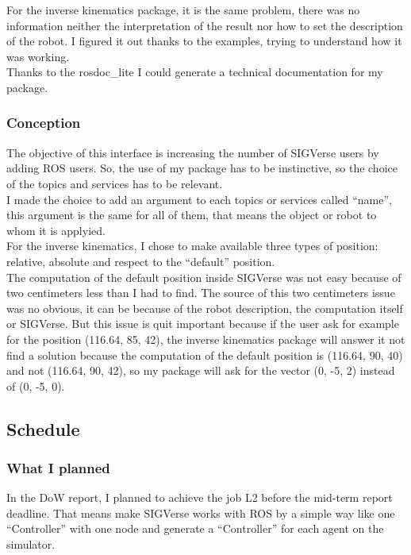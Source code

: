 For the inverse kinematics package, it is the same problem, there was no information neither the interpretation of the result nor how to set the description of the robot. I figured it out thanks to the examples, trying to understand how it was working.\\

Thanks to the rosdoc\_lite I could generate a technical documentation for my package.

\subsubsection{Conception}
The objective of this interface is increasing the number of SIGVerse users by adding ROS users. So, the use of my package has to be instinctive, so the choice of the topics and services has to be relevant.\\
I made the choice to add an argument to each topics or services called ``name'', this argument is the same for all of them, that means the object or robot to whom it is applyied.\\

For the inverse kinematics, I chose to make available three types of position: relative, absolute and respect to the ``default'' position.\\
The computation of the default position inside SIGVerse was not easy because of two centimeters less than I had to find. The source of this two centimeters issue was no obvious, it can be because of the robot description, the computation itself or SIGVerse. But this issue is quit important because if the user ask for example for the position (116.64, 85, 42), the inverse kinematics package will answer it not find a solution because the computation of the default position is (116.64, 90, 40) and not (116.64, 90, 42), so my package will ask for the vector (0, -5, 2) instead of (0, -5, 0).

\subsection{Schedule}
\subsubsection{What I planned}
In the DoW report, I planned to achieve the job L2 before the mid-term report deadline. That means make SIGVerse works with ROS by a simple way like one ``Controller'' with one node and generate a ``Controller'' for each agent on the simulator.\\

